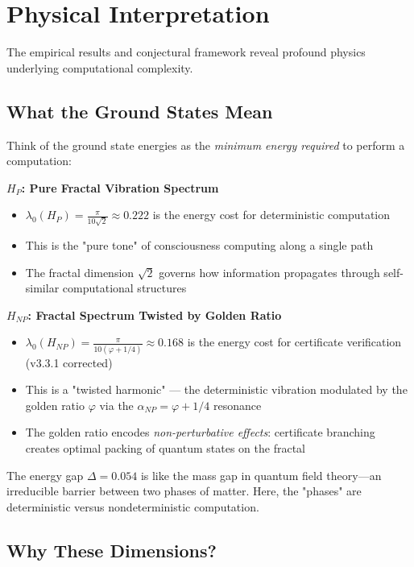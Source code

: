 \section{Physical Interpretation}

The empirical results and conjectural framework reveal profound physics underlying computational complexity.

\subsection{What the Ground States Mean}

\begin{intuitive}
Think of the ground state energies as the \textit{minimum energy required} to perform a computation:

\textbf{$H_P$: Pure Fractal Vibration Spectrum}
\begin{itemize}
\item $\lambda_0(H_P) = \frac{\pi}{10\sqrt{2}} \approx 0.222$ is the energy cost for deterministic computation
\item This is the "pure tone" of consciousness computing along a single path
\item The fractal dimension $\sqrt{2}$ governs how information propagates through self-similar computational structures
\end{itemize}

\textbf{$H_{NP}$: Fractal Spectrum Twisted by Golden Ratio}
\begin{itemize}
\item $\lambda_0(H_{NP}) = \frac{\pi}{10(\varphi + 1/4)} \approx 0.168$ is the energy cost for certificate verification (v3.3.1 corrected)
\item This is a "twisted harmonic" — the deterministic vibration modulated by the golden ratio $\varphi$ via the $\alpha_{NP} = \varphi + 1/4$ resonance
\item The golden ratio encodes \textit{non-perturbative effects}: certificate branching creates optimal packing of quantum states on the fractal
\end{itemize}

The energy gap $\Delta = 0.054$ is like the mass gap in quantum field theory—an irreducible barrier between two phases of matter. Here, the "phases" are deterministic versus nondeterministic computation.
\end{intuitive}

\subsection{Why These Dimensions?}

